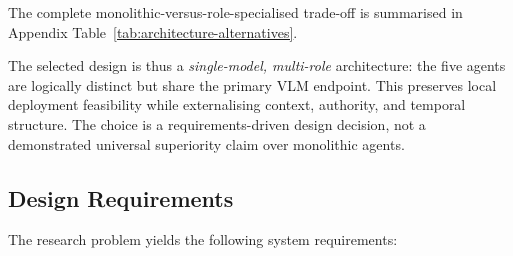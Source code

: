 \documentclass{article}
\begin{document}
The complete monolithic-versus-role-specialised trade-off is summarised in
Appendix Table~\ref{tab:architecture-alternatives}.

The selected design is thus a \emph{single-model, multi-role} architecture: the
five agents are logically distinct but share the primary VLM endpoint. This
preserves local deployment feasibility while externalising context, authority,
and temporal structure. The choice is a requirements-driven design decision,
not a demonstrated universal superiority claim over monolithic agents.

\subsection{Design Requirements}
\label{subsec:methodology-requirements}

The research problem yields the following system requirements:
\end{document}
